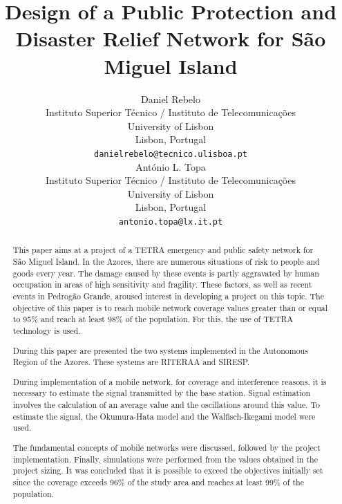 \documentclass[letterpaper, 10 pt, conference]{ieeeconf}  %
\title{\LARGE \bf
Design of a Public Protection and Disaster Relief Network for São Miguel Island}
\author{ \parbox{3 in}{\centering Daniel Rebelo\\
        Instituto Superior Técnico / Instituto de Telecomunicações\\
        University of Lisbon\\
        Lisbon, Portugal\\
        {\tt\small danielrebelo@tecnico.ulisboa.pt}}
        \hspace*{ 0.5 in}
        \parbox{3 in}{ \centering António L. Topa\\
        Instituto Superior Técnico / Instituto de Telecomunicações\\
        University of Lisbon\\
        Lisbon, Portugal\\
        {\tt\small antonio.topa@lx.it.pt}}
}
\begin{document}
\maketitle
\thispagestyle{empty}
\pagestyle{empty}


\begin{abstract}
This paper aims at a project of a TETRA emergency and public safety network for São Miguel Island. In the Azores, there are numerous situations of risk to people and goods every year. The damage caused by these events is partly aggravated by human occupation in areas of high sensitivity and fragility. These factors, as well as recent events in Pedrogão Grande, aroused interest in developing a project on this topic. The objective of this paper is to reach mobile network coverage values greater than or equal to 95\% and reach at least 98\% of the population. For this, the use of TETRA technology is used.\par\noindent
During this paper are presented the two systems implemented in the Autonomous Region of the Azores. These systems are RITERAA and SIRESP.\par\noindent
During implementation of a mobile network, for coverage and interference reasons, it is necessary to estimate the signal transmitted by the base station. Signal estimation involves the calculation of an average value and the oscillations around this value. To estimate the signal, the Okumura-Hata model and the Walfisch-Ikegami model were used.\par\noindent
The fundamental concepts of mobile networks were discussed, followed by the project implementation. Finally, simulations were performed from the values  obtained in the project sizing. It was concluded that it is possible to exceed the objectives initially set since the coverage exceeds 96\% of the study area and reaches at least 99\% of the population.
\end{abstract}


\end{document}
